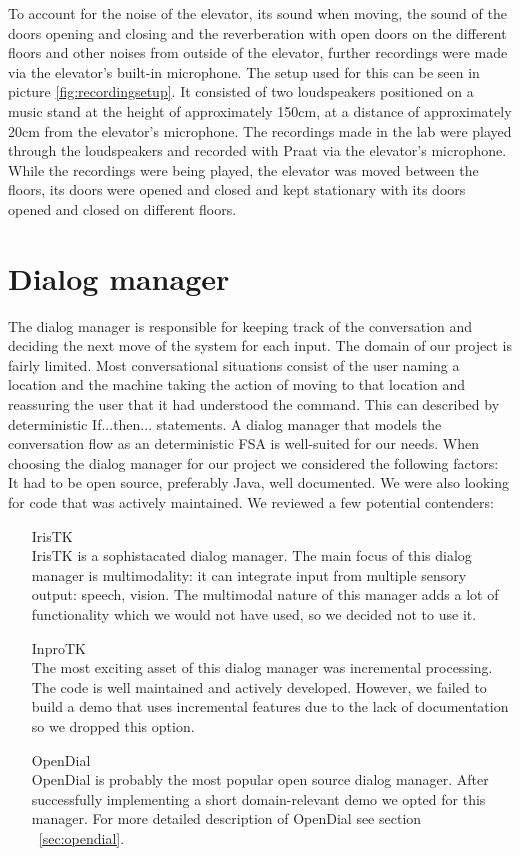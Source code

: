 \documentclass[a4paper, 12pt]{article}
\begin{document}
To account for the noise of the elevator, its sound when moving, the sound of the doors opening and closing and the reverberation with open doors on the different floors and other noises from outside of the elevator, further recordings were made via the elevator's built-in microphone. 
The setup used for this can be seen in picture \ref{fig:recordingsetup}.
It consisted of two loudspeakers positioned on a music stand at the height of approximately 150cm, at a distance of approximately 20cm from the elevator's microphone. 
The recordings made in the lab were played through the loudspeakers and recorded with Praat via the elevator's microphone. 
While the recordings were being played, the elevator was moved between the floors, its doors were opened and closed and kept stationary with its doors opened and closed on different floors.

\section{Dialog manager}
The dialog manager is responsible for keeping track of the conversation and deciding the next move of the system for each input. The domain of our project is fairly limited. Most conversational situations consist of the user naming a location and the machine taking the action of moving to that location and reassuring the user that it had understood the command. This can described by deterministic If...then... statements. A dialog manager that models the conversation flow as an deterministic FSA is well-suited for our needs.
When choosing the dialog manager for our project we considered the following factors: It had to be open source, preferably Java, well documented.
We were also looking for code that was actively maintained.
We reviewed a few potential contenders:
\begin{itemize}
\item[IrisTK] \hfill \\
IrisTK is a sophistacated dialog manager. The main focus of this dialog manager is multimodality: it can integrate input from multiple sensory output: speech, vision. The multimodal nature of this manager adds a lot of functionality which we would not have used, so we decided not to use it.
\item[InproTK] \hfill \\
The most exciting asset of this dialog manager was incremental processing.
The code is well maintained and actively developed. 
However, we failed to build a demo that uses incremental features due to the lack of documentation so we dropped this option.
\item[OpenDial] \hfill \\
OpenDial is probably the most popular open source dialog manager.
After successfully implementing a short domain-relevant demo we opted for this manager.
For more detailed description of OpenDial see section ~\ref{sec:opendial}.
\end{itemize}
\end{document}
